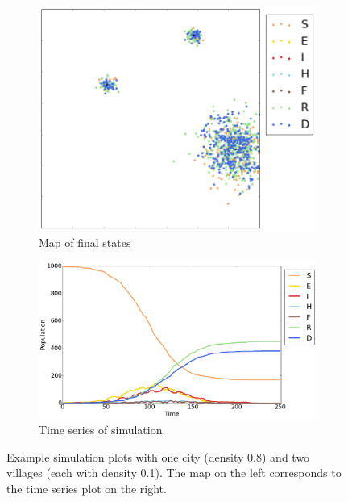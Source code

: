 \begin{figure}
\centering
\begin{subfigure}[t]{0.38\textwidth}
  \includegraphics[width=\textwidth]{map} 
  \caption{Map of final states}
\end{subfigure}
\begin{subfigure}[t]{0.56\textwidth}
  \includegraphics[width=\textwidth]{time}
  \caption{Time series of simulation.}
\end{subfigure}
\caption{Example simulation plots with one city (density 0.8) and two villages (each with density 0.1). The map on the left corresponds to the time series plot on the right.}\label{sabd:ex}
\end{figure}

